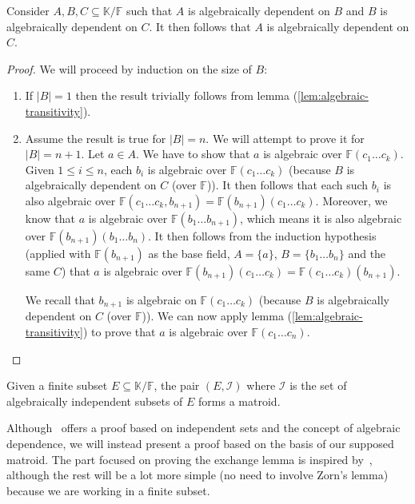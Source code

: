 \begin{lemma}\label{lem:algebraic-dependence-transitivity}
	Consider $A, B, C \subseteq \mathbb K / \mathbb{F} $ such that $A$ is algebraically dependent on $B$ and $B$ is algebraically dependent on $C$. It then follows that $A$ is algebraically dependent on $C$.
\end{lemma}

\begin{proof}
	We will proceed by induction on the size of $B$:
	\begin{enumerate}
		\item If $|B| = 1$ then the result trivially follows from lemma (\ref{lem:algebraic-transitivity}).
		\item Assume the result is true for $|B| = n$. We will attempt to prove it for $|B| = n + 1$. Let $a \in A$. We have to show that $a$ is algebraic over $\mathbb{F}(c _1 \ldots c _k )$. Given $1 \leq i \leq n$, each $b _i$ is algebraic over $\mathbb{F}(c _1 \ldots c _k )$ (because $B$ is algebraically dependent on $C$ (over $\mathbb{F}$)). It then follows that each such $b _i $ is also algebraic over $\mathbb{F}(c _1 \ldots c _k, b _{n + 1}) = \mathbb{F} (b _{n + 1} )(c _1 \ldots c _k )$. Moreover, we know that $a$ is algebraic over $\mathbb{F} (b _1 \ldots b _{n + 1})$, which means it is also algebraic over $\mathbb{F} (b _{n + 1})(b _1 \ldots b _n )$. It then follows from the induction hypothesis (applied with $\mathbb{F} (b _{n + 1})$ as the base field, $A = \{a\}$, $B = \{b _1 \ldots b _n \}$ and the same $C$) that $a$ is algebraic over $\mathbb{F} (b _{n + 1})(c _1 \ldots c _k ) = \mathbb{F} (c _1 \ldots c _k )(b _{n + 1})$.

		      We recall that $b _{n + 1}$ is algebraic on $\mathbb{F} (c _1 \ldots c _k )$ (because $B$ is algebraically dependent on $C$ (over $\mathbb{F} $)). We can now apply lemma (\ref{lem:algebraic-transitivity}) to prove that $a$ is algebraic over $\mathbb{F} (c _1 \ldots c _n)$.
	\end{enumerate}
\end{proof}

\begin{theorem}\label{thm:algebraic-matroids-are-matroids}
	Given a finite subset $E \subseteq \mathbb K / \mathbb F$, the pair $(E, \mathcal I)$  where $\mathcal I$ is the set of algebraically independent subsets of $E$ forms a matroid.
\end{theorem}

Although~\cite{oxley1} offers a proof based on independent sets and the concept of algebraic dependence, we will instead present a proof based on the basis of our supposed matroid. The part focused on proving the exchange lemma is inspired by~\cite{milne2022}, although the rest will be a lot more simple (no need to involve Zorn's lemma) because we are working in a finite subset.


